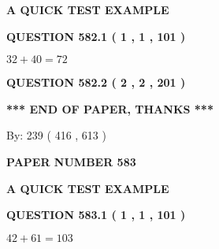 \documentclass[12pt]{article}
\begin{document}
   
   
   
   
   
 \vspace{0.2in}
{\LARGE {\textbf{ A QUICK TEST EXAMPLE}}}
   
   
  
\vspace{0.2in}
  
{\textbf{\Large{QUESTION
582.1 
 ( 1 , 1 , 101 )
}}}
  
  
 
 

$ %
32 +  %
40=   %
72$
 
 
  
\vspace{0.2in}
  
{\textbf{\Large{QUESTION
582.2 
 ( 2 , 2 , 201 )
}}}
  
  
   
   
 \vspace{0.2in}
 
   
   
   
   
\vspace{1.0in} 
{\textbf{\large{ *** END OF PAPER, THANKS *** }}} 
   
   
\hspace{1.0in} By: 
 239 ( 416 ,  613 )
   
   
   
   
\newpage 
\setcounter{page}{ 
   583001 } 
   
   
   
   
 {\textbf{ \Large{ PAPER NUMBER  583  }}}
   
   
\vspace{0.2in}
   
   
   
   
   
   
 \vspace{0.2in}
{\LARGE {\textbf{ A QUICK TEST EXAMPLE}}}
   
   
  
\vspace{0.2in}
  
{\textbf{\Large{QUESTION
583.1 
 ( 1 , 1 , 101 )
}}}
  
  
 
 

$ %
42 +  %
61=   %
103$
 
\end{document}
